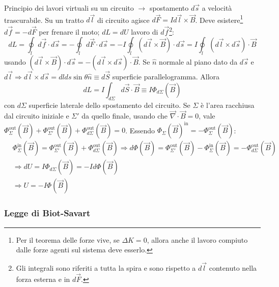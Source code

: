 \documentclass[a4paper]{scrartcl}
\numberwithin{equation}{subsection}
\theoremstyle{style1}
\begin{document}
Principio dei lavori virtuali su un circuito $\to$ spostamento $d\vec{s}$ a velocit\`a trascurabile. Su un tratto $d\vec{l}$ di circuito agisce $d\vec{F} = Id\vec{l}\times \vec{B}$. Deve esistere\footnote{Per il teorema delle forze vive, se $\Delta K = 0$, allora anche il lavoro compiuto dalle forze agenti sul sistema deve esserlo.} $d\vec{f} = -d\vec{F}$ per frenare il moto; $dL = dU$ lavoro di $d\vec{f}$\footnote{Gli integrali sono riferiti a tutta la spira e sono rispetto a $d\vec{l}$ contenuto nella forza esterna e in $d\vec{F}$.}:
\begin{equation}
	dL = \oint_l d\vec{f}\cdot d\vec{s}  = - \oint_{l} d\vec{F}\cdot d\vec{s} = - I \oint_{l}  (d\vec{l}\times \vec{B}) \cdot d\vec{s} =  I \oint_{l}  (d\vec{l}\times d\vec{s}) \cdot \vec{B}
\end{equation}
usando $(d\vec{l}\times \vec{B}) \cdot d\vec{s} = - (d\vec{l}\times d\vec{s}) \cdot \vec{B}$. Se $\hat{n}$ normale al piano dato da $d\vec{s}$ e $d\vec{l}\Rightarrow d\vec{l}\times d\vec{s} = dl ds \sin \theta  \hat{n}\equiv d\vec{S}$ superficie parallelogramma. Allora 
\begin{equation}
	dL = I \int_{d\Sigma} d\vec{S}\cdot \vec{B} \equiv I \Phi _{d\Sigma}(\vec{B})  
\end{equation}
con $d\Sigma$ superficie laterale dello spostamento del circuito. Se $\Sigma$ \`e l'area racchiusa dal circuito iniziale e $\Sigma'$ da quello finale, usando che $\vec{\nabla }\cdot \vec{B} = 0$, vale $\Phi^\text{out} _\Sigma(\vec{B})+\Phi^\text{out} _{\Sigma'}(\vec{B}) + \Phi^\text{out} _{d\Sigma} (\vec{B}) = 0$. Essendo $\Phi_\Sigma(\vec{B})^\text{in} = - \Phi_{\Sigma}^\text{out} (\vec{B})$:
\begin{equation}
	\begin{split}
		&\Phi^\text{in} _\Sigma(\vec{B})=\Phi^\text{out} _{\Sigma'}(\vec{B}) + \Phi^\text{out} _{d\Sigma} (\vec{B})\Rightarrow d\Phi(\vec{B}) = 	\Phi^\text{out} _{\Sigma'}(\vec{B})-\Phi^\text{in} _\Sigma(\vec{B}) = - \Phi_{d\Sigma}^{\text{out}} (\vec{B}) \\
		&\Rightarrow dU = I\Phi_{d\Sigma}(\vec{B}) = - I d\Phi (\vec{B})\\
		&\Rightarrow U = - I \Phi(\vec{B})
	\end{split}
\end{equation}
\subsubsection{Legge di Biot-Savart}
\end{document}
